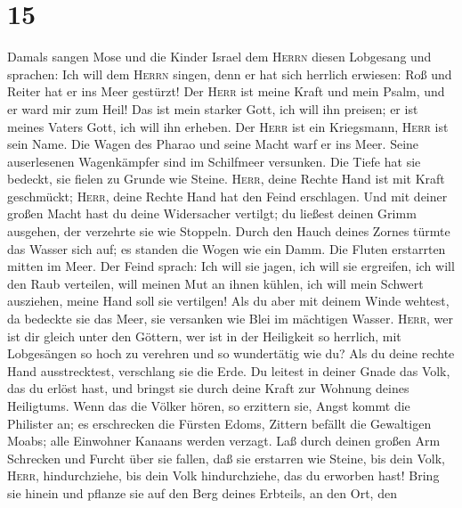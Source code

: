 \hypertarget{section-14}{%
\section{15}\label{section-14}}

 Damals sangen Mose und die Kinder Israel dem
\textsc{Herrn} diesen Lobgesang und sprachen: Ich will dem
\textsc{Herrn} singen, denn er hat sich herrlich erwiesen: Roß und
Reiter hat er ins Meer gestürzt!  Der \textsc{Herr} ist
meine Kraft und mein Psalm, und er ward mir zum Heil! Das ist mein
starker Gott, ich will ihn preisen; er ist meines Vaters Gott, ich will
ihn erheben.  Der \textsc{Herr} ist ein Kriegsmann,
\textsc{Herr} ist sein Name.  Die Wagen des Pharao und
seine Macht warf er ins Meer. Seine auserlesenen Wagenkämpfer sind im
Schilfmeer versunken.  Die Tiefe hat sie bedeckt, sie
fielen zu Grunde wie Steine.  \textsc{Herr}, deine Rechte
Hand ist mit Kraft geschmückt; \textsc{Herr}, deine Rechte Hand hat den
Feind erschlagen.  Und mit deiner großen Macht hast du
deine Widersacher vertilgt; du ließest deinen Grimm ausgehen, der
verzehrte sie wie Stoppeln.  Durch den Hauch deines Zornes
türmte das Wasser sich auf; es standen die Wogen wie ein Damm. Die
Fluten erstarrten mitten im Meer.  Der Feind sprach: Ich
will sie jagen, ich will sie ergreifen, ich will den Raub verteilen,
will meinen Mut an ihnen kühlen, ich will mein Schwert ausziehen, meine
Hand soll sie vertilgen!  Als du aber mit deinem Winde
wehtest, da bedeckte sie das Meer, sie versanken wie Blei im mächtigen
Wasser.  \textsc{Herr}, wer ist dir gleich unter den
Göttern, wer ist in der Heiligkeit so herrlich, mit Lobgesängen so hoch
zu verehren und so wundertätig wie du?  Als du deine
rechte Hand ausstrecktest, verschlang sie die Erde.  Du
leitest in deiner Gnade das Volk, das du erlöst hast, und bringst sie
durch deine Kraft zur Wohnung deines Heiligtums.  Wenn
das die Völker hören, so erzittern sie, Angst kommt die Philister an;
 es erschrecken die Fürsten Edoms, Zittern befällt die
Gewaltigen Moabs; alle Einwohner Kanaans werden verzagt. 
Laß durch deinen großen Arm Schrecken und Furcht über sie fallen, daß
sie erstarren wie Steine, bis dein Volk, \textsc{Herr}, hindurchziehe,
bis dein Volk hindurchziehe, das du erworben hast!  Bring
sie hinein und pflanze sie auf den Berg deines Erbteils, an den Ort, den

